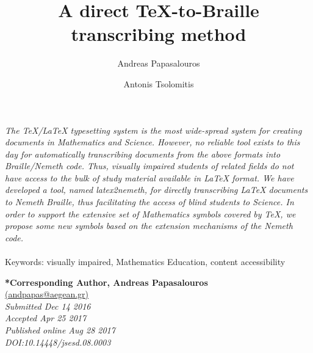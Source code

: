 \documentclass[11.5pt]{sig-alternate} %
\makeatletter
\let\oldabstract\abstract
\let\oldendabstract\endabstract
\renewenvironment{abstract} %
{\renewenvironment{quotation}%
               {\list{}{\addtolength{\leftmargin}{1em} %
                        \listparindent 1.5em%
                        \itemindent    \listparindent%
                        \rightmargin   \leftmargin%
                        \parsep        \z@ \@plus\p@}%
                \item\relax}%
               {\endlist}%
\oldabstract}
{\oldendabstract}
\makeatother
\begin{document}
\title{A direct TeX-to-Braille transcribing method}

\author[1]{\large \color{blue}Andreas Papasalouros}
\author[1]{\large \color{blue}Antonis Tsolomitis}

\toappear{}
\maketitle
\begin{@twocolumnfalse} 
\begin{abstract}
\item 
\textit{The TeX/LaTeX typesetting system is the most wide-spread system for creating documents in Mathematics and Science. However, no reliable tool exists to this day for automatically transcribing documents from the above formats into Braille/Nemeth code. Thus, visually impaired students of related fields do not have access to the bulk of study material available in LaTeX format. We have developed a tool, named latex2nemeth, for directly transcribing LaTeX documents to Nemeth Braille, thus facilitating the access of blind students to Science. In order to support the extensive set of Mathematics symbols covered by TeX, we propose some new symbols based on the extension mechanisms of the Nemeth code.}
\\ \\
Keywords: visually impaired, Mathematics Education, content accessibility
\end{abstract}
\end{@twocolumnfalse}


\textbf{*Corresponding Author, Andreas Papasalouros}\\
\href{mailto: andpapas@aegean.gr}{(andpapas@aegean.gr)} \\
\textit{Submitted Dec 14 2016 }\\
\textit{Accepted Apr 25 2017} \\
\textit{Published online Aug 28 2017} \\
\textit{DOI:10.14448/jsesd.08.0003} \\
\pagebreak
\clearpage
\end{document}
